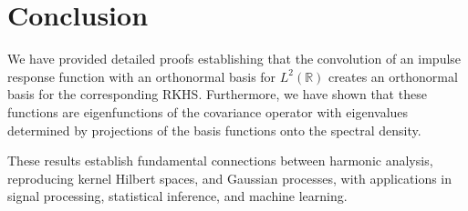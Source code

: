 \documentclass{article}
\begin{document}
\section{Conclusion}

We have provided detailed proofs establishing that the convolution of an impulse response function with an orthonormal basis for $L^2(\mathbb{R})$ creates an orthonormal basis for the corresponding RKHS. Furthermore, we have shown that these functions are eigenfunctions of the covariance operator with eigenvalues determined by projections of the basis functions onto the spectral density.

These results establish fundamental connections between harmonic analysis, reproducing kernel Hilbert spaces, and Gaussian processes, with applications in signal processing, statistical inference, and machine learning.
\end{document}
